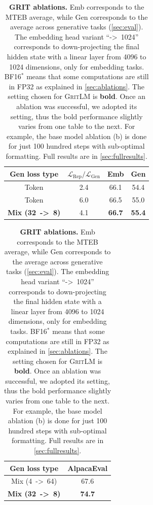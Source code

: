 \documentclass{article}
\newcommand{\model}{\textsc{GritLM}}
\newcommand{\method}{\textsc{GRIT}}
\begin{document}
\begin{table}[htbp]
{\begin{minipage}{\linewidth}{\begin{center}
\begin{tabular}{cc|cc}
\toprule 
Gen loss type & $\mathcal{L}_{\text{Rep}}/\mathcal{L}_{\text{Gen}}$ & Emb & Gen \\
\midrule
Token & 2.4 & 66.1 & 54.4 \\
Token & 6.0 & 66.5 & 55.0 \\
\textbf{Mix (32~->~8)} & 4.1 & \textbf{66.7} & \textbf{55.4} \\ 
\bottomrule
\end{tabular}
\hspace{1em}
\begin{tabular}{c|c}
\toprule 
Gen loss type & AlpacaEval \\
\midrule
Mix (4~->~64) & 67.6 \\
\textbf{Mix (32~->~8)} & \textbf{74.7} \\
\bottomrule
\end{tabular}
\end{center}}\end{minipage}
}
\caption{\textbf{\method{} ablations.} Emb corresponds to the MTEB average, while Gen corresponds to the average across generative tasks (\autoref{sec:eval}). The embedding head variant ``->~1024'' corresponds to down-projecting the final hidden state with a linear layer from 4096 to 1024 dimensions, only for embedding tasks. BF16$^*$ means that some computations are still in FP32 as explained in \autoref{sec:ablations}. The setting chosen for \model{} is \textbf{bold}. Once an ablation was successful, we adopted its setting, thus the bold performance slightly varies from one table to the next. For example, the base model ablation (b) is done for just 100 hundred steps with sub-optimal formatting. Full results are in \autoref{sec:fullresults}.}
\label{tab:ablations} 
\end{table}
\end{document}
